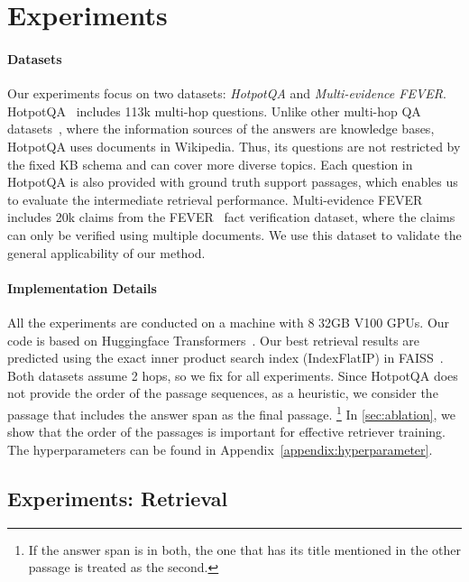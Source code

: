 \documentclass{article} \usepackage{iclr2021_conference,times}
\begin{document}
\section{Experiments} 
\label{sec:task}





\paragraph{Datasets} 
Our experiments focus on two datasets: \emph{HotpotQA} and \emph{Multi-evidence FEVER}.
HotpotQA~\citep{HotpotQA} includes 113k multi-hop questions.
Unlike other multi-hop QA datasets~\citep{MetaQA,ComplexWebQ,Wikihop}, where the information sources of the answers are knowledge bases, 
HotpotQA uses documents in Wikipedia. Thus, its questions are not restricted by the fixed KB schema and can cover more diverse topics. Each question in HotpotQA is also provided with ground truth support passages, which enables us to evaluate the intermediate retrieval performance.
Multi-evidence FEVER includes 20k claims from the FEVER~\citep{FEVER} fact verification dataset, where the claims can only be verified using multiple documents. 
We use this dataset to validate the general applicability of our method.




\paragraph{Implementation Details} 
All the experiments are conducted on a machine with 8 32GB V100 GPUs. Our code is based on Huggingface Transformers~\citep{wolf2019huggingface}. Our best retrieval results are predicted using the exact inner product search index (IndexFlatIP) in FAISS~\citep{FAISS}. Both datasets assume 2 hops, so we fix  for all experiments. Since HotpotQA does not provide the order of the passage sequences, as a heuristic, we consider the passage that includes the answer span as the final passage.
\footnote{If the answer span is in both, the one that has its title mentioned in the other passage is treated as the second.}
In \cref{sec:ablation}, we show that the order of the passages is important for effective retriever training. The hyperparameters can be found in Appendix~\ref{appendix:hyperparameter}. 





\subsection{Experiments: Retrieval}
\label{sec:exp}
\end{document}

